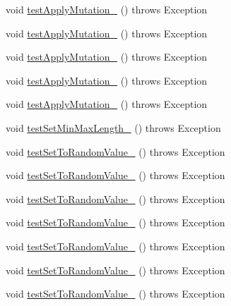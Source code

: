 \begin{DoxyCompactItemize}
\item 
void \hyperlink{classorg_1_1jgap_1_1impl_1_1_string_gene_test_ab862e29ff4e0a3b1af37805865a333f6}{test\-Apply\-Mutation\-\_} ()  throws Exception 
\item 
void \hyperlink{classorg_1_1jgap_1_1impl_1_1_string_gene_test_acfcc706bef6eae46a909f2c3d76f4284}{test\-Apply\-Mutation\-\_} ()  throws Exception 
\item 
void \hyperlink{classorg_1_1jgap_1_1impl_1_1_string_gene_test_ad31eda30431fa32afe1e53a6b77d6f35}{test\-Apply\-Mutation\-\_} ()  throws Exception 
\item 
void \hyperlink{classorg_1_1jgap_1_1impl_1_1_string_gene_test_a71f22bda848dcc8068d5ab9d02c7c5b4}{test\-Apply\-Mutation\-\_} ()  throws Exception 
\item 
void \hyperlink{classorg_1_1jgap_1_1impl_1_1_string_gene_test_a9fa863b46600410f7d4b25000cefa612}{test\-Apply\-Mutation\-\_} ()  throws Exception 
\item 
void \hyperlink{classorg_1_1jgap_1_1impl_1_1_string_gene_test_aff9a07caa7864db8494770249d18e160}{test\-Set\-Min\-Max\-Length\-\_} ()  throws Exception 
\item 
void \hyperlink{classorg_1_1jgap_1_1impl_1_1_string_gene_test_ae331bea59a36e18e9edaaa8b66fa3607}{test\-Set\-To\-Random\-Value\-\_} ()  throws Exception 
\item 
void \hyperlink{classorg_1_1jgap_1_1impl_1_1_string_gene_test_ad280f69c098d53acb65e5e7af85ddf61}{test\-Set\-To\-Random\-Value\-\_} ()  throws Exception 
\item 
void \hyperlink{classorg_1_1jgap_1_1impl_1_1_string_gene_test_ab8429d0a6bd03309f2bb2866affb5857}{test\-Set\-To\-Random\-Value\-\_} ()  throws Exception 
\item 
void \hyperlink{classorg_1_1jgap_1_1impl_1_1_string_gene_test_a1a19b79e86f435af5e5f0058d11e9b8c}{test\-Set\-To\-Random\-Value\-\_} ()  throws Exception 
\item 
void \hyperlink{classorg_1_1jgap_1_1impl_1_1_string_gene_test_af4a00cb5ade8d1121e76867b4af970c2}{test\-Set\-To\-Random\-Value\-\_} ()  throws Exception 
\item 
void \hyperlink{classorg_1_1jgap_1_1impl_1_1_string_gene_test_a377400089fed3e13dec987b5f0e5f88f}{test\-Set\-To\-Random\-Value\-\_} ()  throws Exception 
\item 
void \hyperlink{classorg_1_1jgap_1_1impl_1_1_string_gene_test_a314c2f07ca1c966499c4e65f73331378}{test\-Set\-To\-Random\-Value\-\_} ()  throws Exception 

\end{DoxyCompactItemize}
